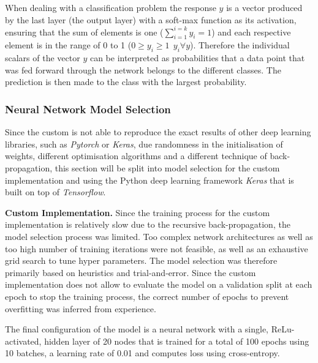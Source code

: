 When dealing with a classification problem the response $y$ is a vector produced by the last layer (the output layer) with a soft-max function as its activation, ensuring that the sum of elements is one ($\sum_{i=1}^{i=k}y_i = 1$) and each respective element is in the range of 0 to 1 ($0\ge y_i \ge 1 \ \ y_i \forall y$).  
Therefore the individual scalars of the vector $y$ can be interpreted as probabilities that a data point that was fed forward through the network belongs to the different classes. The prediction is then made to the class with the largest probability. 

\subsubsection{Neural Network Model Selection}
Since the custom  is not able to reproduce the exact results of other deep learning libraries, such as \textit{Pytorch} or \textit{Keras}, due randomness in the initialisation of weights, different optimisation algorithms and a different technique of back-propagation, this section will be split into model selection for the custom implementation and using the Python deep learning framework \textit{Keras} that is built on top of \textit{Tensorflow}.
\newline

\textbf{Custom Implementation. }
Since the training process for the custom  implementation is relatively slow due to the recursive back-propagation, the model selection process was limited. Too complex network architectures as well as too high number of training iterations were not feasible, as well as an exhaustive grid search to tune hyper parameters. The model selection was therefore primarily based on heuristics and trial-and-error. Since the custom implementation does not allow to evaluate the model on a validation split at each epoch to stop the training process, the correct number of epochs to prevent overfitting was inferred from experience.

The final configuration of the model is a neural network with a single, ReLu-activated, hidden layer of 20 nodes that is trained for a total of 100 epochs using 10 batches, a learning rate of 0.01 and computes loss using cross-entropy.
\newline

